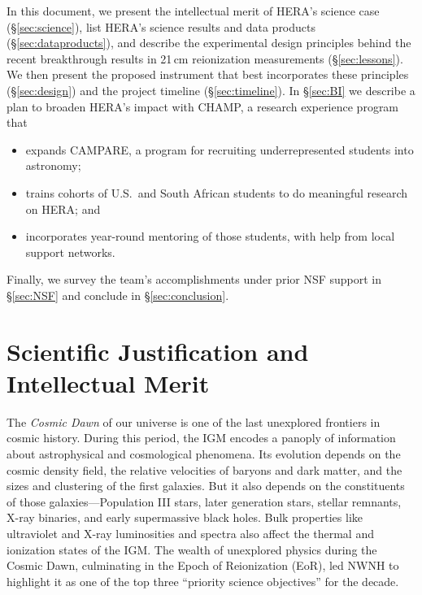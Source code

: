 \documentclass[preprint,11pt]{aastex}
\begin{document}
\noindent In this document, we 
present the intellectual merit of HERA's science case (\S\ref{sec:science}),
list HERA's science results and data products (\S\ref{sec:dataproducts}), and
describe the experimental design principles behind the recent breakthrough results in 21\,cm reionization measurements (\S\ref{sec:lessons}).
We then present the proposed instrument that best incorporates these principles (\S\ref{sec:design}) and the project
timeline (\S\ref{sec:timeline}).  In \S\ref{sec:BI} we describe a
plan to broaden HERA's impact with CHAMP, a research experience program that
\begin{itemize}[noitemsep,nolistsep]
\item expands CAMPARE, a program for recruiting underrepresented students into astronomy;
\item trains cohorts of U.S.\ and South African students to do meaningful research on HERA; and
\item incorporates year-round mentoring of those students, with help from local support networks. 
\end{itemize}
Finally, we survey the team's accomplishments under prior NSF support in \S\ref{sec:NSF} and conclude in \S\ref{sec:conclusion}.


\vspace{-18pt}
\section{Scientific Justification and Intellectual Merit}
\vspace{-5pt}
\label{sec:science}

\noindent The {\it Cosmic Dawn} of our universe is one of the last unexplored
frontiers in cosmic history. During this period, the IGM encodes a
panoply of information about astrophysical and cosmological phenomena. Its
evolution depends on the cosmic density field, the relative velocities of
baryons and dark matter, and the sizes and clustering of the first galaxies.
But it also depends on the constituents of those galaxies---Population
III stars, later generation stars, stellar remnants, X-ray binaries,
and early supermassive black holes.  Bulk properties like
ultraviolet and X-ray luminosities and spectra also affect the thermal and
ionization states of the IGM.  The wealth of unexplored physics during the Cosmic Dawn,
culminating in the Epoch of Reionization (EoR), 
led NWNH to highlight it as one of the top three ``priority science objectives'' for
the decade.
\end{document}
